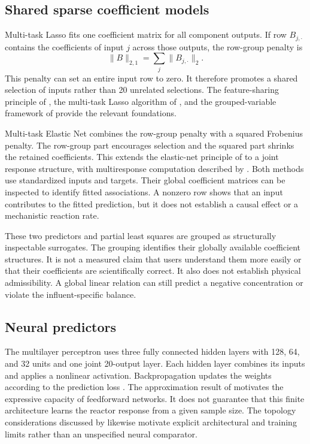\subsection{Shared sparse coefficient models}

Multi-task Lasso fits one coefficient matrix for all component outputs. If row $B_{j,\cdot}$ contains the coefficients of input $j$ across those outputs, the row-group penalty is
\begin{equation}
\|B\|_{2,1}=\sum_j\|B_{j,\cdot}\|_2.
\label{eq:multiresponse_row_penalty}
\end{equation}
This penalty can set an entire input row to zero. It therefore promotes a shared selection of inputs rather than 20 unrelated selections. The feature-sharing principle of \citet{Argyriou2008}, the multi-task Lasso algorithm of \citet{Liu2009}, and the grouped-variable framework of \citet{Yuan2006} provide the relevant foundations.

Multi-task Elastic Net combines the row-group penalty with a squared Frobenius penalty. The row-group part encourages selection and the squared part shrinks the retained coefficients. This extends the elastic-net principle of \citet{Zou2005} to a joint response structure, with multiresponse computation described by \citet{Simon2013}. Both methods use standardized inputs and targets. Their global coefficient matrices can be inspected to identify fitted associations. A nonzero row shows that an input contributes to the fitted prediction, but it does not establish a causal effect or a mechanistic reaction rate.

These two predictors and partial least squares are grouped as structurally inspectable surrogates. The grouping identifies their globally available coefficient structures. It is not a measured claim that users understand them more easily or that their coefficients are scientifically correct. It also does not establish physical admissibility. A global linear relation can still predict a negative concentration or violate the influent-specific balance.

\subsection{Neural predictors}

The multilayer perceptron uses three fully connected hidden layers with 128, 64, and 32 units and one joint 20-output layer. Each hidden layer combines its inputs and applies a nonlinear activation. Backpropagation updates the weights according to the prediction loss \citep{Rumelhart1986}. The approximation result of \citet{Hornik1989} motivates the expressive capacity of feedforward networks. It does not guarantee that this finite architecture learns the reactor response from a given sample size. The topology considerations discussed by \citet{Curteanu2011} likewise motivate explicit architectural and training limits rather than an unspecified neural comparator.

